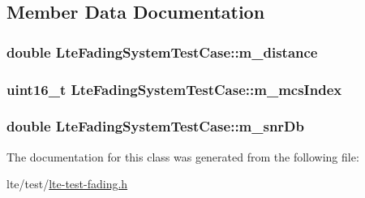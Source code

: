 \subsection{Member Data Documentation}
\subsubsection[{\texorpdfstring{m\+\_\+distance}{m_distance}}]{\setlength{\rightskip}{0pt plus 5cm}double Lte\+Fading\+System\+Test\+Case\+::m\+\_\+distance\hspace{0.3cm}{\ttfamily [private]}}\hypertarget{classLteFadingSystemTestCase_a8493e45c3499a4f57eabc63367f8e33c}{}\label{classLteFadingSystemTestCase_a8493e45c3499a4f57eabc63367f8e33c}
\subsubsection[{\texorpdfstring{m\+\_\+mcs\+Index}{m_mcsIndex}}]{\setlength{\rightskip}{0pt plus 5cm}uint16\+\_\+t Lte\+Fading\+System\+Test\+Case\+::m\+\_\+mcs\+Index\hspace{0.3cm}{\ttfamily [private]}}\hypertarget{classLteFadingSystemTestCase_a12d1aa1f9d27f9a4c775d8498ada8018}{}\label{classLteFadingSystemTestCase_a12d1aa1f9d27f9a4c775d8498ada8018}
\subsubsection[{\texorpdfstring{m\+\_\+snr\+Db}{m_snrDb}}]{\setlength{\rightskip}{0pt plus 5cm}double Lte\+Fading\+System\+Test\+Case\+::m\+\_\+snr\+Db\hspace{0.3cm}{\ttfamily [private]}}\hypertarget{classLteFadingSystemTestCase_a3ce706944dc05ad18b5db3927be77453}{}\label{classLteFadingSystemTestCase_a3ce706944dc05ad18b5db3927be77453}


The documentation for this class was generated from the following file\+:\begin{DoxyCompactItemize}
\item 
lte/test/\hyperlink{lte-test-fading_8h}{lte-\/test-\/fading.\+h}\end{DoxyCompactItemize}
